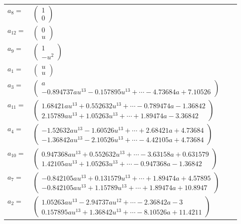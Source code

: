 \documentclass[1p]{elsarticle_modified}
\theoremstyle{definition}
\begin{document}
\begin{tabular}{m{7pt} m{180pt} m{7pt} m{180pt} }
\flushright $a_{8}=$&$\begin{pmatrix}1\\0\end{pmatrix}$ \\
\flushright $a_{12}=$&$\begin{pmatrix}0\\u\end{pmatrix}$ \\
\flushright $a_{9}=$&$\begin{pmatrix}1\\- u^2\end{pmatrix}$ \\
\flushright $a_{1}=$&$\begin{pmatrix}u\\u\end{pmatrix}$ \\
\flushright $a_{3}=$&$\begin{pmatrix}a\\-0.894737 a u^{13}-0.157895 u^{13}+\cdots-4.73684 a+7.10526\end{pmatrix}$ \\
\flushright $a_{11}=$&$\begin{pmatrix}1.68421 a u^{13}+0.552632 u^{13}+\cdots-0.789474 a-1.36842\\2.15789 a u^{13}+1.05263 u^{13}+\cdots+1.89474 a-3.36842\end{pmatrix}$ \\
\flushright $a_{4}=$&$\begin{pmatrix}-1.52632 a u^{13}-1.60526 u^{13}+\cdots+2.68421 a+4.73684\\-1.36842 a u^{13}-2.10526 u^{13}+\cdots-4.42105 a+4.73684\end{pmatrix}$ \\
\flushright $a_{10}=$&$\begin{pmatrix}0.947368 a u^{13}+0.552632 u^{13}+\cdots-3.63158 a+0.631579\\1.42105 a u^{13}+1.05263 u^{13}+\cdots-0.947368 a-1.36842\end{pmatrix}$ \\
\flushright $a_{7}=$&$\begin{pmatrix}-0.842105 a u^{13}+0.131579 u^{13}+\cdots+1.89474 a+4.57895\\-0.842105 a u^{13}+1.15789 u^{13}+\cdots+1.89474 a+10.8947\end{pmatrix}$ \\
\flushright $a_{2}=$&$\begin{pmatrix}1.05263 a u^{13}-2.94737 a u^{12}+\cdots-2.36842 a-3\\0.157895 a u^{13}+1.36842 u^{13}+\cdots-8.10526 a+11.4211\end{pmatrix}$ \\

\end{tabular}
\end{document}
